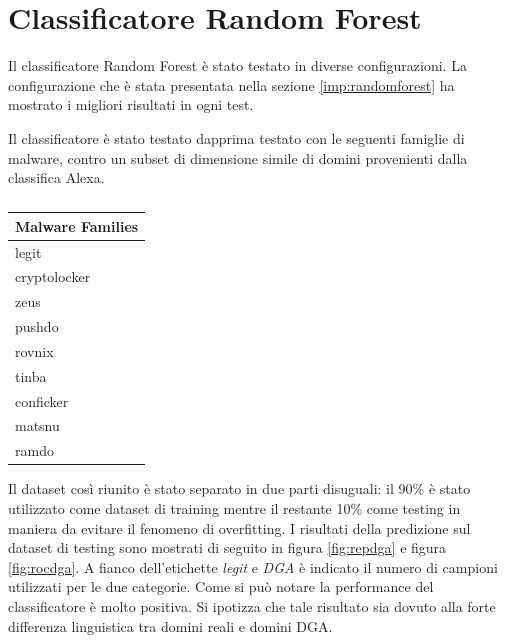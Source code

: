 \section{Classificatore Random Forest}
\label{res:crf}
Il classificatore Random Forest è stato testato in diverse configurazioni. La configurazione che è stata presentata nella sezione \ref{imp:randomforest} ha mostrato i migliori risultati in ogni test.

Il classificatore è stato testato dapprima testato con le seguenti famiglie di malware, contro un subset di dimensione simile di domini provenienti dalla classifica Alexa.

\begin{table}[!htbp]
    \centering
    \begin{tabular}[t]{l}
    \toprule
    Malware Families \\
    \midrule
legit \\
cryptolocker \\
zeus \\
pushdo \\
rovnix \\
tinba \\
conficker \\
matsnu \\
ramdo \\
\bottomrule
\end{tabular}
\caption{\label{tab:malware}}
\end{table}

Il dataset così riunito è stato separato in due parti disuguali: il 90\% è stato utilizzato come dataset di training mentre il restante 10\% come testing in maniera da evitare il fenomeno di overfitting. I risultati della predizione sul dataset di testing sono mostrati di seguito in figura \ref{fig:repdga} e figura \ref{fig:rocdga}. A fianco dell'etichette \textit{legit} e \textit{DGA} è indicato il numero di campioni utilizzati per le due categorie. Come si può notare la performance del classificatore è molto positiva. Si ipotizza che tale risultato sia dovuto alla forte differenza linguistica tra domini reali e domini DGA. 

